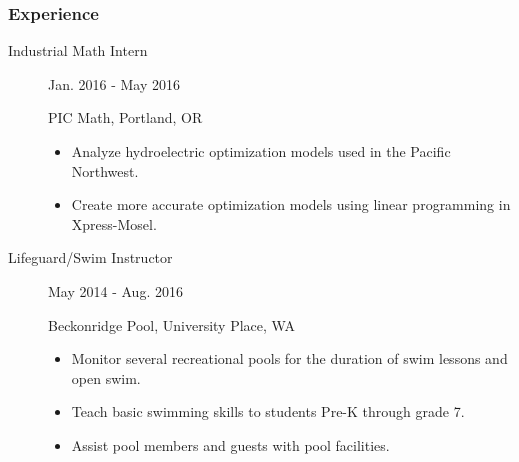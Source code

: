 \documentclass{article}
\begin{document}
\subsubsection*{Experience}

    \begin{description}
        \item[Industrial Math Intern] \hfill Jan. 2016 - May 2016
        
        PIC Math, Portland, OR
        \begin{itemize}
            \item Analyze hydroelectric optimization models used in the Pacific Northwest.
            \item Create more accurate optimization models using linear programming in Xpress-Mosel.
        \end{itemize}
        
        \vspace{0.5em}

        \item [Lifeguard/Swim Instructor] \hfill May 2014 - Aug. 2016
        
        Beckonridge Pool, University Place, WA
        \begin{itemize}
            \item Monitor several recreational pools for the duration of swim lessons and open swim.
            \item Teach basic swimming skills to students Pre-K through grade 7.
            \item Assist pool members and guests with pool facilities.
        \end{itemize}

        
    \end{description}
\end{document}
